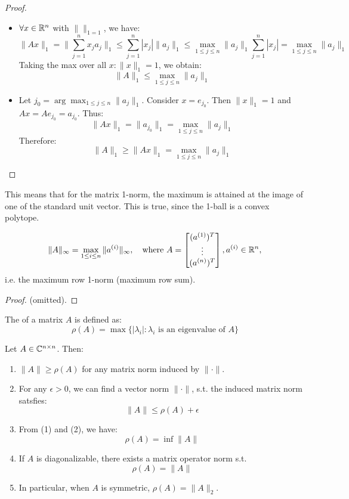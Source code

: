 \documentclass[../main/main.tex]{subfiles}
\begin{document}
\begin{proof}
\begin{itemize}
  \item $\forall x \in\mathbb{R}^{n}$ with $\|\|_{1 = 1}$, we have: \[
        \|Ax\|_{1} = \|\sum_{j=1}^n x_{j}a_{j}\|_{1} \leq \sum_{j=1}^n |x_{j}| \|a_{j}\|_{1} \leq \max_{1\leq j\leq n} \|a_{j}\|_{1} \sum_{j=1}^n |x_{j}| = \max_{1\leq j\leq n} \|a_{j}\|_{1}
        \]
        Taking the max over all $x: \|x\|_{1}=1$, we obtain: \[
\|A\|_{1} \leq \max_{1\leq j\leq n} \|a_{j}\|_{1}
        \]
  \item Let $j_{0} = \arg\max_{1\leq j\leq n} \|a_{j}\|_{1}$. Consider $x=e_{j_{0}}$. Then $\|x\|_{1}=1$ and $Ax=Ae_{j_{0}}= a_{j_{0}}$. Thus: \[
\|Ax\|_{1}= \|a_{j_{0}}\|_{1} = \max_{1\leq j\leq n} \|a_{j}\|_{1}
        \] Therefore: \[
        \|A\|_{1}\geq \|Ax\|_{1} =\max_{1\leq j\leq n} \|a_{j}\|_{1} \]
\end{itemize}
\end{proof}
\begin{remark}
This means that for the matrix 1-norm, the maximum is attained at the image of one of the standard unit vector. This is true, since the 1-ball is a convex polytope.
\end{remark}
\begin{theorem}
  \[
    \|A\|_{\infty}= \max_{1\leq i \leq n}\|a^{(i)}\|_{\infty}, \quad\text{where }A = \begin{bmatrix}
(a^{(1)})^{T}\\
\vdots\\
(a^{(n)})^{T}\\
    \end{bmatrix} , a^{(i)}\in\mathbb{R}^{n}
 , \] i.e. the maximum row 1-norm (maximum row sum).
\end{theorem}
\begin{proof}
  (omitted).
\end{proof}
\begin{definition}
  The  of a matrix $A$ is defined as: \[
    \rho(A) = \max \{|\lambda_{i}| : \lambda_{i} \text{ is an eigenvalue of }A
    \}\]
\end{definition}
\begin{theorem}
  Let $A\in\mathbb{C}^{n\times n}$. Then:
  \begin{enumerate}
\item $\|A\|\geq \rho(A)$ for any matrix norm induced by $\|\cdot\|$.
    \item For any $\epsilon>0$, we can find a vector norm $\|\cdot\|$, s.t. the induced matrix norm satsfies: \[
          \|A\|\leq \rho(A)+\epsilon
          \]
          \item
  From (1) and (2), we have: \[
          \rho(A) = \inf \|A\|
          \]
    \item If $A$ is diagonalizable, there exists a matrix operator norm s.t. \[
          \rho(A) = \|A\|
          \]
          \item In particular, when $A$ is symmetric, $\rho(A) = \|A\|_{2}$.
  \end{enumerate}
\end{theorem}
\end{document}
